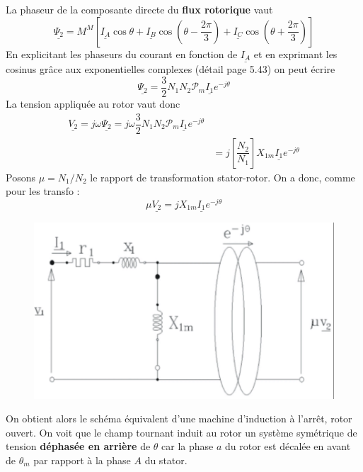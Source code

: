 		La phaseur de la composante directe du \textbf{flux rotorique} vaut 
		\begin{equation}
		\underline{\Psi_2}=M^M[\underline{I_A}\cos\theta + \underline{I_B}
		\cos(\theta-\frac{2\pi}{3}) + \underline{I_C}\cos(\theta+\frac{2\pi}{3})]
		\end{equation}
		En explicitant les phaseurs du courant en fonction de $\underline{I_A}$ 
		et en exprimant les cosinus grâce aux exponentielles complexes (détail 
		page 5.43) on peut écrire
		\begin{equation}
		\underline{\Psi_2} = \dfrac{3}{2}N_1N_2\mathcal{P}_m\underline{I_1}e^{-j
		\theta}
		\end{equation}
		La tension appliquée au rotor vaut donc
		\begin{equation}
		\begin{array}{ll}
		\underline{V_2} = j\omega\underline{\Psi_2} = j\omega\dfrac{3}{2}N_1N_2
		\mathcal{P}_m\underline{I_1}e^{-j\theta}\\
		&= j\left[\dfrac{N_2}{N_1}\right]X_{1m}\underline{I_1}e^{-j\theta}
		\end{array}
		\end{equation}
		Posons $\mu = N_1/N_2$ le rapport de transformation stator-rotor. On a 
		donc, comme pour les transfo :
		\begin{equation}
		\mu\underline{V_2} = jX_{1m}\underline{I_1}e^{-j\theta}
		\end{equation}
		\newpage
		\begin{figure}
		\vspace{-8mm}
		\includegraphics[scale=0.5]{ch5/image18.png}
		\end{figure}
		On obtient alors le schéma équivalent d'une machine d'induction à l'arrêt, 
		rotor ouvert. On voit que le champ tournant induit au rotor un système 
		symétrique de tension \textbf{déphasée en arrière} de $\theta$ car la phase 
		$a$ du rotor est décalée en avant de $\theta_m$ par rapport à la phase $A$ 
		du stator.\\
		
